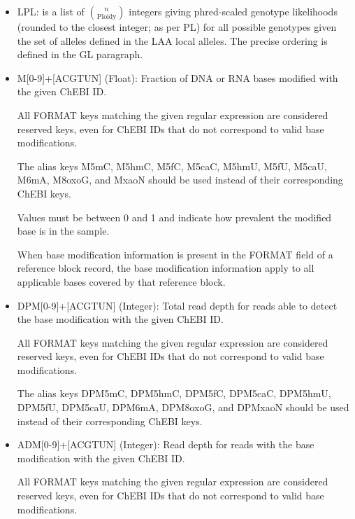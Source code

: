 \documentclass[8pt]{article}
\begin{document}
\begin{itemize}
  Due to BCF encoding empty vectors as missing, implementation-defined Number=LA local-allele fields should not be used if distinguishing between zero-length data and missing data is required at REF-only sites.

  It is recommended that VCF libraries provide an API in which local allele encoding can be abstracted away from the API consumer and values accessed through their corresponding non-local key.

  \item LPL: is a list of $n \choose \mathrm{Ploidy}$ integers giving phred-scaled genotype likelihoods (rounded to the closest integer; as per PL) for all possible genotypes given the set of alleles defined in the LAA local alleles.
  The precise ordering is defined in the GL paragraph.

  \item M[0-9]+[ACGTUN] (Float): Fraction of DNA or RNA bases modified with the given ChEBI ID.

  All FORMAT keys matching the given regular expression are considered reserved keys, even for ChEBI IDs that do not correspond to valid base modifications.

  The alias keys M5mC, M5hmC, M5fC, M5caC, M5hmU, M5fU, M5caU, M6mA, M8oxoG, and MxaoN should be used instead of their corresponding ChEBI keys.

  Values must be between 0 and 1 and indicate how prevalent the modified base is in the sample.

  When base modification information is present in the FORMAT field of a reference block record, the base modification information apply to all applicable bases covered by that reference block.

  \item DPM[0-9]+[ACGTUN] (Integer): Total read depth for reads able to detect the base modification with the given ChEBI ID.

  All FORMAT keys matching the given regular expression are considered reserved keys, even for ChEBI IDs that do not correspond to valid base modifications.

  The alias keys DPM5mC, DPM5hmC, DPM5fC, DPM5caC, DPM5hmU, DPM5fU, DPM5caU, DPM6mA, DPM8oxoG, and DPMxaoN should be used instead of their corresponding ChEBI keys.

  \item ADM[0-9]+[ACGTUN] (Integer): Read depth for reads with the base modification with the given ChEBI ID.

  All FORMAT keys matching the given regular expression are considered reserved keys, even for ChEBI IDs that do not correspond to valid base modifications.


\end{itemize}
\end{document}
